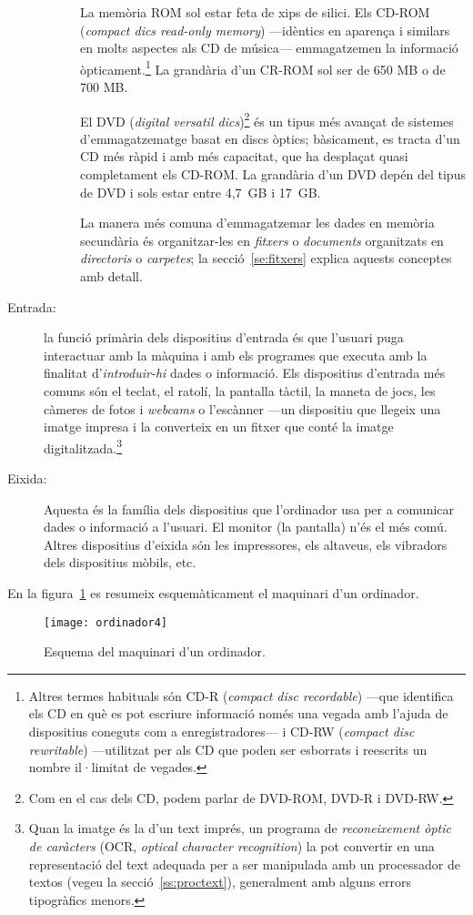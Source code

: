 \begin{description}
\begin{description}
    La memòria ROM sol estar feta de xips de silici. Els CD-ROM
    (\emph{compact dics read-only memory}) ---idèntics en aparença i
    similars en molts aspectes als CD de música--- emmagatzemen la
    informació òpticament.\footnote{Altres termes habituals són CD-R
      (\emph{compact disc recordable}) ---que identifica els CD en què
      es pot escriure informació només una vegada amb l'ajuda de
      dispositius coneguts com a enregistradores--- i CD-RW
      (\emph{compact disc rewritable}) ---utilitzat per als CD que
      poden ser esborrats i reescrits un nombre il·limitat de
      vegades.} La grandària d'un CR-ROM sol ser de 650 MB o de 700
    MB.

    El DVD (\emph{digital versatil dics})\footnote{Com en el cas dels
      CD, podem parlar de DVD-ROM, DVD-R i DVD-RW.} és un tipus més
    avançat de sistemes d'emmagatzematge basat en discs òptics;
    bàsicament, es tracta d'un CD més ràpid i amb més capacitat, que
    ha desplaçat quasi completament els CD-ROM. La grandària d'un DVD
    depén del tipus de DVD i sols estar entre 4,7~GB i 17~GB.
    
    La manera més comuna d'emmagatzemar les dades en memòria
    secundària és organitzar-les en {\em fitxers} o \emph{documents}
    organitzats en \emph{directoris} o \emph{carpetes}; la
    secció~\ref{se:fitxers} explica aquests conceptes amb
    detall.\label{pg:menciofitxer}
  \end{description}

\item[Entrada:] la funció primària dels dispositius d'entrada és que
  l'usuari puga interactuar amb la màquina i amb els programes que
  executa amb la finalitat d'\emph{introduir-hi} dades o
  informació. Els dispositius d'entrada més comuns són el teclat, el
  ratolí, la pantalla tàctil, la maneta de jocs, les càmeres de fotos
  i \emph{webcams} o l'escànner ---un dispositiu que llegeix una
  imatge impresa i la converteix en un fitxer  que conté la imatge
  digitalitzada.\footnote{Quan la imatge és la d'un text imprés, un
    programa de \emph{reconeixement òptic de caràcters} (OCR,
    \emph{optical character recognition}) la pot convertir en una
    representació del text adequada per a ser manipulada amb un
    processador de textos (vegeu la secció~\ref{ss:proctext}),
    generalment amb alguns errors tipogràfics menors.}

\item[Eixida:] Aquesta és la família dels dispositius que l'ordinador
  usa per a comunicar dades o informació a l'usuari.  El monitor (la
  pantalla) n'és el més comú. Altres dispositius d'eixida són les
  impressores, els altaveus, els vibradors dels dispositius mòbils,
  etc.

\end{description}
En la figura~\ref{fg:ordinador} es resumeix esquemàticament el
maquinari d'un ordinador.
\begin{figure}
  \centering
  \texttt{[image: ordinador4]}
  \caption{Esquema del maquinari d'un ordinador.}
  \label{fg:ordinador}
\end{figure}


